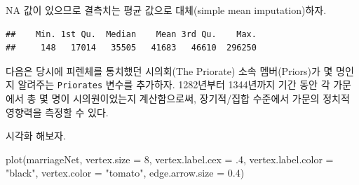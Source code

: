 \documentclass[
]{book}
\newenvironment{Shaded}{\begin{snugshade}}{\end{snugshade}}
\newcommand{\AttributeTok}[1]{\textcolor[rgb]{0.77,0.63,0.00}{#1}}
\newcommand{\DecValTok}[1]{\textcolor[rgb]{0.00,0.00,0.81}{#1}}
\newcommand{\FloatTok}[1]{\textcolor[rgb]{0.00,0.00,0.81}{#1}}
\newcommand{\FunctionTok}[1]{\textcolor[rgb]{0.00,0.00,0.00}{#1}}
\newcommand{\NormalTok}[1]{#1}
\newcommand{\OtherTok}[1]{\textcolor[rgb]{0.56,0.35,0.01}{#1}}
\newcommand{\SpecialCharTok}[1]{\textcolor[rgb]{0.00,0.00,0.00}{#1}}
\newcommand{\StringTok}[1]{\textcolor[rgb]{0.31,0.60,0.02}{#1}}
\begin{document}
NA 값이 있으므로 결측치는 평균 값으로 대체(simple mean imputation)하자.

\begin{Shaded}
\end{Shaded}

\begin{verbatim}
##    Min. 1st Qu.  Median    Mean 3rd Qu.    Max. 
##     148   17014   35505   41683   46610  296250
\end{verbatim}

다음은 당시에 피렌체를 통치했던 시의회(The Priorate) 소속 멤버(Priors)가 몇 명인지 알려주는 \texttt{Priorates} 변수를 추가하자. 1282년부터 1344년까지 기간 동안 각 가문에서 총 몇 명이 시의원이었는지 계산함으로써, 장기적/집합 수준에서 가문의 정치적 영향력을 측정할 수 있다.

\begin{Shaded}
\end{Shaded}

시각화 해보자.

\begin{Shaded}
\begin{Highlighting}[]
\FunctionTok{plot}\NormalTok{(marriageNet, }\AttributeTok{vertex.size =} \DecValTok{8}\NormalTok{, }\AttributeTok{vertex.label.cex =}\NormalTok{ .}\DecValTok{4}\NormalTok{, }\AttributeTok{vertex.label.color =} \StringTok{"black"}\NormalTok{, }\AttributeTok{vertex.color =} \StringTok{"tomato"}\NormalTok{, }\AttributeTok{edge.arrow.size =} \FloatTok{0.4}\NormalTok{)}
\end{Highlighting}
\end{Shaded}
\end{document}
